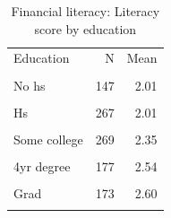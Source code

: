 \begin{table}[htbp]\centering\small
\caption{Financial literacy: Literacy score by education}
\label{tab:finlit_score_by_educ}
\begin{tabular}{lrr}\toprule
Education & N & Mean \\\\ \midrule
No hs & 147 & 2.01 \\\\
Hs & 267 & 2.01 \\\\
Some college & 269 & 2.35 \\\\
4yr degree & 177 & 2.54 \\\\
Grad & 173 & 2.60 \\\\
\bottomrule
\end{tabular}\end{table}
